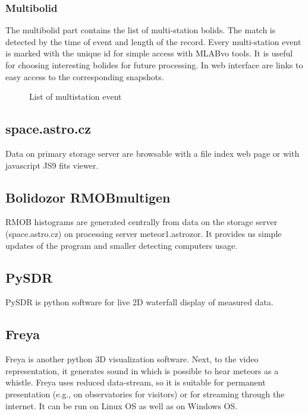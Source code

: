 \documentclass[10pt,a4paper,twoside,dvips]{article}
\begin{document}
\begin{IMCpaper}
\subsubsection{Multibolid}
The multibolid part contains the list of multi-station bolids. The match is detected by the time of event and length of the record. Every multi-station event is marked with the unique id for simple access with MLABvo tools. It is useful for choosing interesting bolides for future processing. In web interface are links to easy access to the corresponding snapshots.


\begin{figure}[htb]
\centering
{}
\caption{List of multistation event}%
\label{RTBb}
\end{figure}

\subsection{space.astro.cz}
Data on primary storage server are browsable with a file index web page or with javascript JS9 fits viewer.                                                     

\subsection{Bolidozor RMOBmultigen}
RMOB histograms are generated centrally from data on the storage server (space.astro.cz) on processing server meteor1.astrozor. It provides us simple updates of the program and smaller detecting computers usage.                                                         


\subsection{PySDR}
PySDR is python software for live 2D waterfall display of measured data.                                                  
\subsection{Freya}
Freya is another python 3D visualization software. Next, to the video representation, it generates sound in which is possible to hear meteors as a whistle. Freya uses reduced data-stream, so it is suitable for permanent presentation (e.g., on observatories for visitors) or for streaming through the internet. It can be run on Linux OS as well as on Windows OS.                                                                                    


\end{IMCpaper}
\end{document}
